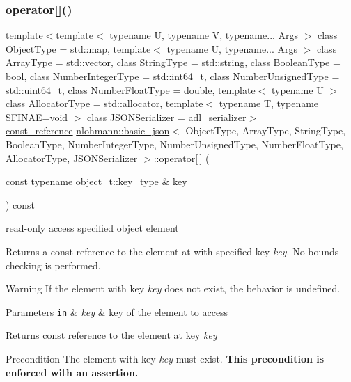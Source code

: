 \subsubsection{\texorpdfstring{operator[]()}{operator[]()}\hspace{0.1cm}{\footnotesize\ttfamily [4/8]}}
{\footnotesize\ttfamily template$<$template$<$ typename U, typename V, typename... Args $>$ class Object\+Type = std\+::map, template$<$ typename U, typename... Args $>$ class Array\+Type = std\+::vector, class String\+Type  = std\+::string, class Boolean\+Type  = bool, class Number\+Integer\+Type  = std\+::int64\+\_\+t, class Number\+Unsigned\+Type  = std\+::uint64\+\_\+t, class Number\+Float\+Type  = double, template$<$ typename U $>$ class Allocator\+Type = std\+::allocator, template$<$ typename T, typename S\+F\+I\+N\+A\+E=void $>$ class J\+S\+O\+N\+Serializer = adl\+\_\+serializer$>$ \\
\mbox{\hyperlink{classnlohmann_1_1basic__json_a4057c5425f4faacfe39a8046871786ca}{const\+\_\+reference}} \mbox{\hyperlink{classnlohmann_1_1basic__json}{nlohmann\+::basic\+\_\+json}}$<$ Object\+Type, Array\+Type, String\+Type, Boolean\+Type, Number\+Integer\+Type, Number\+Unsigned\+Type, Number\+Float\+Type, Allocator\+Type, J\+S\+O\+N\+Serializer $>$\+::operator\mbox{[}$\,$\mbox{]} (\begin{DoxyParamCaption}\item[{const typename object\+\_\+t\+::key\+\_\+type \&}]{key }\end{DoxyParamCaption}) const\hspace{0.3cm}{\ttfamily [inline]}}



read-\/only access specified object element 

Returns a const reference to the element at with specified key {\itshape key}. No bounds checking is performed.

\begin{DoxyWarning}{Warning}
If the element with key {\itshape key} does not exist, the behavior is undefined.
\end{DoxyWarning}

\begin{DoxyParams}[1]{Parameters}
\mbox{\tt in}  & {\em key} & key of the element to access\\
\hline
\end{DoxyParams}
\begin{DoxyReturn}{Returns}
const reference to the element at key {\itshape key} 
\end{DoxyReturn}
\begin{DoxyPrecond}{Precondition}
The element with key {\itshape key} must exist. {\bfseries This precondition is enforced with an assertion.}
\end{DoxyPrecond}

